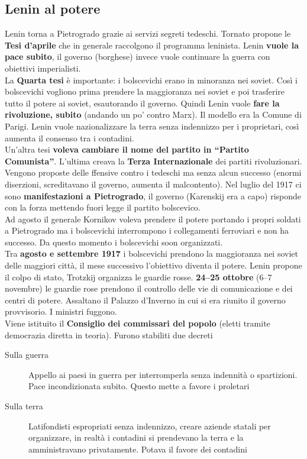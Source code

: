\subsection{Lenin al potere}
Lenin torna a Pietrogrado grazie ai servizi segreti tedeschi. Tornato propone le \textbf{Tesi 
d'aprile} che in generale raccolgono il programma leninista. Lenin \textbf{vuole la pace subito}, il
governo (borghese) invece vuole continuare la guerra con obiettivi imperialisti.\\
La \textbf{Quarta tesi} è importante: i bolscevichi erano in minoranza nei soviet. Così i bolscevichi
vogliono prima prendere la maggioranza nei soviet e poi trasferire tutto il potere ai soviet,
esautorando il governo. Quindi Lenin vuole \textbf{fare la rivoluzione, subito} (andando un po'
contro Marx). Il modello era la Comune di Parigi. Lenin vuole nazionalizzare la terra senza 
indennizzo per i proprietari, così aumenta il consenso tra i contadini.\\
Un'altra tesi \textbf{voleva cambiare il nome del partito in ``Partito Comunista''}. L'ultima creava
la \textbf{Terza Internazionale} dei partiti rivoluzionari.\\ [\baselineskip]
Vengono proposte delle ffensive contro i tedeschi ma senza alcun successo (enormi diserzioni,
screditavano il governo, aumenta il malcontento). Nel luglio del 1917 ci sono \textbf{manifestazioni
a Pietrogrado}, il governo (Karenskij era a capo) risponde con la forza mettendo fuori legge il 
partito bolscevico.\\
Ad agosto il generale Kornikov voleva prendere il potere portando i propri soldati a Pietrogrado ma
i bolscevichi interrompono i collegamenti ferroviari e non ha successo. Da questo momento i 
bolscevichi soon organizzati.\\ [\baselineskip]
Tra \textbf{agosto e settembre 1917} i bolscevichi prendono la maggioranza nei soviet delle maggiori
città, il mese successivo l'obiettivo diventa il potere. Lenin propone il colpo di stato, Trotzkij
organizza le guardie rosse. \textbf{24--25 ottobre} (6--7 novembre) le guardie rose prendono il 
controllo delle vie di comunicazione e dei centri di potere. Assaltano il Palazzo d'Inverno in cui si
era riunito il governo provvisorio. I ministri fuggono.\\
Viene istituito il \textbf{Consiglio dei commissari del popolo} (eletti tramite democrazia diretta in
teoria). Furono stabiliti due decreti
\begin{description}
  \item[Sulla guerra] Appello ai paesi in guerra per interromperla senza indennità o spartizioni. 
    Pace incondizionata subito. Questo mette a favore i proletari
  \item[Sulla terra] Latifondisti espropriati senza indennizzo, creare aziende statali per 
    organizzare, in realtà i contadini si prendevano la terra e la amministravano privatamente. 
    Potava il favore dei contadini
\end{description}
